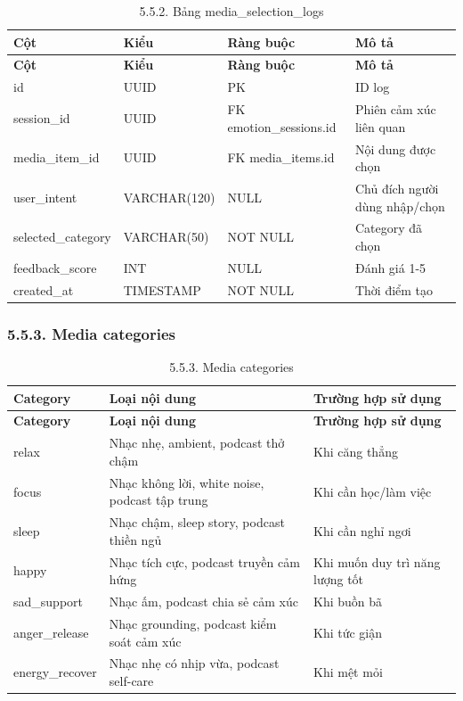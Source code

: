 \documentclass[12pt,a4paper]{article}
\begin{document}
\begin{center}
\scriptsize
\begin{longtable}{|P{0.18\textwidth}|P{0.25\textwidth}|P{0.25\textwidth}|P{0.22\textwidth}|}
\caption{5.5.2. Bảng media\_selection\_logs}\\
\hline
\textbf{Cột} & \textbf{Kiểu} & \textbf{Ràng buộc} & \textbf{Mô tả} \\
\hline
\endfirsthead
\hline
\textbf{Cột} & \textbf{Kiểu} & \textbf{Ràng buộc} & \textbf{Mô tả} \\
\hline
\endhead
id & UUID & PK & ID log \\
\hline
session\_id & UUID & FK emotion\_sessions.id & Phiên cảm xúc liên quan \\
\hline
media\_item\_id & UUID & FK media\_items.id & Nội dung được chọn \\
\hline
user\_intent & VARCHAR(120) & NULL & Chủ đích người dùng nhập/chọn \\
\hline
selected\_category & VARCHAR(50) & NOT NULL & Category đã chọn \\
\hline
feedback\_score & INT & NULL & Đánh giá 1-5 \\
\hline
created\_at & TIMESTAMP & NOT NULL & Thời điểm tạo \\
\hline
\end{longtable}
\normalsize
\end{center}

\subsubsection*{5.5.3. Media categories}

\begin{center}
\begin{longtable}{|P{0.25\textwidth}|P{0.32\textwidth}|P{0.33\textwidth}|}
\caption{5.5.3. Media categories}\\
\hline
\textbf{Category} & \textbf{Loại nội dung} & \textbf{Trường hợp sử dụng} \\
\hline
\endfirsthead
\hline
\textbf{Category} & \textbf{Loại nội dung} & \textbf{Trường hợp sử dụng} \\
\hline
\endhead
relax & Nhạc nhẹ, ambient, podcast thở chậm & Khi căng thẳng \\
\hline
focus & Nhạc không lời, white noise, podcast tập trung & Khi cần học/làm việc \\
\hline
sleep & Nhạc chậm, sleep story, podcast thiền ngủ & Khi cần nghỉ ngơi \\
\hline
happy & Nhạc tích cực, podcast truyền cảm hứng & Khi muốn duy trì năng lượng tốt \\
\hline
sad\_support & Nhạc ấm, podcast chia sẻ cảm xúc & Khi buồn bã \\
\hline
anger\_release & Nhạc grounding, podcast kiểm soát cảm xúc & Khi tức giận \\
\hline
energy\_recover & Nhạc nhẹ có nhịp vừa, podcast self-care & Khi mệt mỏi \\
\hline
\end{longtable}
\end{center}
\end{document}
